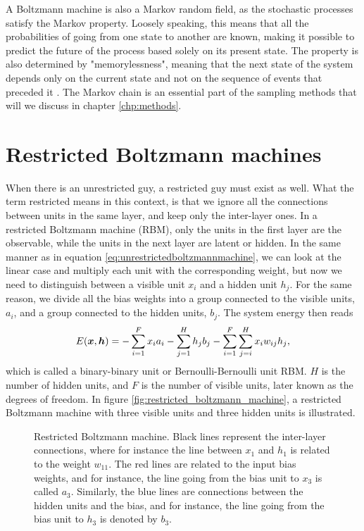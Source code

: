A Boltzmann machine is also a Markov random field, as the stochastic processes satisfy the Markov property. Loosely speaking, this means that all the probabilities of going from one state to another are known, making it possible to predict the future of the process based solely on its present state. The property is also determined by "memorylessness", meaning that the next state of the system depends only on the current state and not on the sequence of events that preceded it \cite{fischer_training_2014}. The Markov chain is an essential part of the sampling methods that will we discuss in chapter \ref{chp:methods}.

\section{Restricted Boltzmann machines} \label{sec:RBM}
When there is an unrestricted guy, a restricted guy must exist as well. What the term restricted means in this context, is that we ignore all the connections between units in the same layer, and keep only the inter-layer ones. In a restricted Boltzmann machine (RBM), only the units in the first layer are the observable, while the units in the next layer are latent or hidden. In the same manner as in equation \eqref{eq:unrestrictedboltzmannmachine}, we can look at the linear case and multiply each unit with the corresponding weight, but now we need to distinguish between a visible unit $x_i$ and a hidden unit $h_j$. For the same reason, we divide all the bias weights into a group connected to the visible units, $a_i$, and a group connected to the hidden units, $b_j$. The system energy then reads
\begin{equation}
E(\boldsymbol{{x}},\boldsymbol{{h}})=- \sum_{i=1}^Fx_ia_i- \sum_{j=1}^Hh_jb_j-\sum_{i=1}^F\sum_{j=i}^H x_iw_{ij}h_j,
\label{eq:binarybinary}
\end{equation}
which is called a binary-binary unit or Bernoulli-Bernoulli unit RBM. $H$ is the number of hidden units, and $F$ is the number of visible units, later known as the degrees of freedom. In figure \eqref{fig:restricted_boltzmann_machine}, a restricted Boltzmann machine with three visible units and three hidden units is illustrated.

\begin{figure}
	\centering
	
	\caption{Restricted Boltzmann machine. Black lines represent the inter-layer connections, where for instance the line between $x_1$ and $h_1$ is related to the weight $w_{11}$. The red lines are related to the input bias weights, and for instance, the line going from the bias unit to $x_3$ is called $a_3$. Similarly, the blue lines are connections between the hidden units and the bias, and for instance, the line going from the bias unit to $h_3$ is denoted by $b_3$.}
	\label{fig:restricted_boltzmann_machine}
\end{figure}


